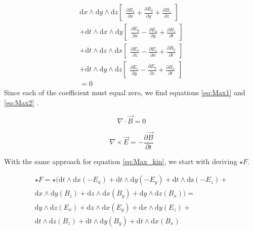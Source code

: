 \begin{gather*}
\mathrm{d}x \wedge \mathrm{d}y \wedge \mathrm{d}z \begin{bmatrix} \frac{\partial B_x}{\partial x}+\frac{\partial B_y}{\partial y}+\frac{\partial B_z}{\partial z} \end{bmatrix}  \\+
\mathrm{d}t \wedge \mathrm{d}x \wedge \mathrm{d}y \begin{bmatrix} \frac{\partial E_y}{\partial x}-\frac{\partial E_x}{\partial y}+\frac{\partial B_z}{\partial t} \end{bmatrix} \\+
\mathrm{d}t \wedge \mathrm{d}z \wedge \mathrm{d}x \begin{bmatrix}\frac{\partial E_x}{\partial z}-\frac{\partial E_z}{\partial x}+\frac{\partial B_y}{\partial t}
\end{bmatrix} \\
+\mathrm{d}t \wedge \mathrm{d}y \wedge \mathrm{d}z \begin{bmatrix}\frac{\partial E_z}{\partial y}-\frac{\partial E_y}{\partial z}+\frac{\partial B_x}{\partial t}\end{bmatrix} \\=0
\end{gather*}
Since each of the coefficient must equal zero, we find equations \ref{eq:Max1} and \ref{eq:Max2} . 

\begin{equation}
\nabla \cdot \vec{B}=0
\label{eq:Max1}
\end{equation}

\begin{equation}
\nabla \times \vec{E}= - \frac{\partial \vec{B}}{\partial t}
\label{eq:Max2}
\end{equation}

With the same approach for equation \ref{eq:Max_kin}, we start with deriving $\star F$. 

\begin{gather*}
\star F=\star(\mathrm{d}t \wedge \mathrm{d}x(-E_x)+\mathrm{d}t \wedge \mathrm{d}y(-E_y)+\mathrm{d}t \wedge \mathrm{dz}(-E_z) + \\\mathrm{d}x \wedge \mathrm{d}y(B_z)+\mathrm{d}z \wedge \mathrm{d}x(B_y)+\mathrm{d}y \wedge \mathrm{d}z(B_x))=\\\mathrm{d}y \wedge \mathrm{d}z(E_x)+\mathrm{d}z \wedge \mathrm{d}x(E_y)+\mathrm{d}x \wedge \mathrm{d}y(E_z) + \\\mathrm{d}t \wedge \mathrm{d}z(B_z)+\mathrm{d}t \wedge \mathrm{d}y(B_y)+\mathrm{d}t \wedge \mathrm{d}x(B_x)
\end{gather*}

